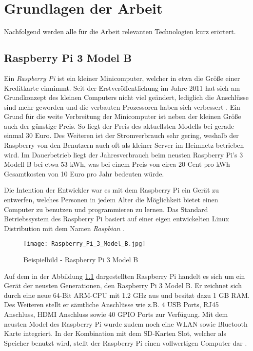 
\chapter{Grundlagen der Arbeit}

Nachfolgend werden alle für die Arbeit relevanten Technologien kurz erörtert.

\section{Raspberry Pi 3 Model B}
Ein \textit{Raspberry Pi} ist ein kleiner Minicomputer, welcher in etwa die
Größe einer Kreditkarte einnimmt. Seit der Erstveröffentlichung im Jahre 2011
hat sich am Grundkonzept des kleinen Computers nicht viel geändert, lediglich
die Anschlüsse sind mehr geworden und die verbauten Prozessoren haben sich
verbessert \autocite{monk_2019}. \newline
Ein Grund für die weite Verbreitung der Minicomputer ist neben der kleinen
Größe auch der günstige Preis. So liegt der Preis des aktuellsten Modells bei
gerade einmal 30 Euro. Des Weiteren ist der Stromverbrauch sehr gering, weshalb
der Raspberry von den Benutzern auch oft als kleiner Server im Heimnetz
betrieben wird. Im Dauerbetrieb liegt der Jahresverbrauch beim neusten
Raspberry Pi's 3 Modell B bei etwa 53 kWh, was bei einem Preis von circa 20
Cent pro kWh Gesamtkosten von 10 Euro pro Jahr bedeuten würde. \newline

Die Intention der Entwickler war es mit dem Raspberry Pi ein Gerät zu
entwerfen, welches Personen in jedem Alter die Möglichkeit bietet einen
Computer zu benutzen und programmieren zu lernen. Das Standard Betriebssystem
des Raspberry Pi basiert auf einer eigen entwickelten Linux Distribution mit
dem Namen \textit{Raspbian} \autocite{what_is_a_raspberry_pi?_2019}.

\begin{figure}[h]
	\centering
	\texttt{[image: Raspberry\_Pi\_3\_Model\_B.jpg]}
	\caption{Beispielbild - Raspberry Pi 3 Model B \autocite{raspberry_pi_2019}}
	\label{img:grafik-RaspberryPi3}
\end{figure}

Auf dem in der Abbildung \ref{img:grafik-RaspberryPi3} dargestellten Raspberry
Pi handelt es sich um ein Gerät der neusten Generationen, den Raspberry Pi 3
Model B. Er zeichnet sich durch eine neue 64-Bit \ac{ARM}-\ac{CPU} mit 1.2
\ac{GHz} aus und besitzt dazu 1 \ac{GB} \ac{RAM}. Des Weiteren stellt er
sämtliche Anschlüsse wie z.B. 4 \ac{USB} Ports, RJ45 Anschluss, \ac{HDMI}
Anschluss sowie 40 \ac{GPIO} Ports zur Verfügung. Mit dem neusten Model des
Raspberry Pi wurde zudem noch eine \ac{WLAN} sowie Bluetooth Karte integriert.
In der Kombination mit dem \ac{SD-Karten} Slot, welcher als Speicher benutzt
wird, stellt der Raspberry Pi einen vollwertigen Computer dar \autocite{kurniawan_2016}.
 
